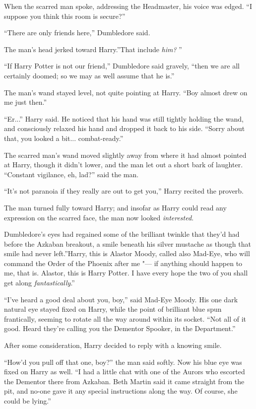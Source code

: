 When the scarred man spoke, addressing the Headmaster, his voice was
edged. ``I suppose you think this room is secure?''

``There are only friends here,'' Dumbledore said.

The man's head jerked toward Harry.''That include \emph{him?} ''

``If Harry Potter is not our friend,'' Dumbledore said gravely, ``then
we are all certainly doomed; so we may as well assume that he is.''

The man's wand stayed level, not quite pointing at Harry. ``Boy almost
drew on me just then.''

``Er...'' Harry said. He noticed that his hand was still tightly
holding the wand, and consciously relaxed his hand and dropped it back
to his side. ``Sorry about that, you looked a bit...
combat-ready.''

The scarred man's wand moved slightly away from where it had almost
pointed at Harry, though it didn't lower, and the man let out a short
bark of laughter. ``Constant vigilance, eh, lad?'' said the man.

``It's not paranoia if they really are out to get you,'' Harry recited
the proverb.

The man turned fully toward Harry; and insofar as Harry could read any
expression on the scarred face, the man now looked \emph{interested}.

Dumbledore's eyes had regained some of the brilliant twinkle that they'd
had before the Azkaban breakout, a smile beneath his silver mustache as
though that smile had never left.''Harry, this is Alastor Moody, called
also Mad-Eye, who will command the Order of the Phoenix after me "--- if
anything should happen to me, that is. Alastor, this is Harry Potter. I
have every hope the two of you shall get along \emph{fantastically}.''

``I've heard a good deal about you, boy,'' said Mad-Eye Moody. His one
dark natural eye stayed fixed on Harry, while the point of brilliant
blue spun frantically, seeming to rotate all the way around within its
socket. ``Not all of it good. Heard they're calling you the Dementor
Spooker, in the Department.''

After some consideration, Harry decided to reply with a knowing smile.

``How'd you pull off that one, boy?'' the man said softly. Now his blue
eye was fixed on Harry as well. ``I had a little chat with one of the
Aurors who escorted the Dementor there from Azkaban. Beth Martin said it
came straight from the pit, and no-one gave it any special instructions
along the way. Of course, she could be lying.''

